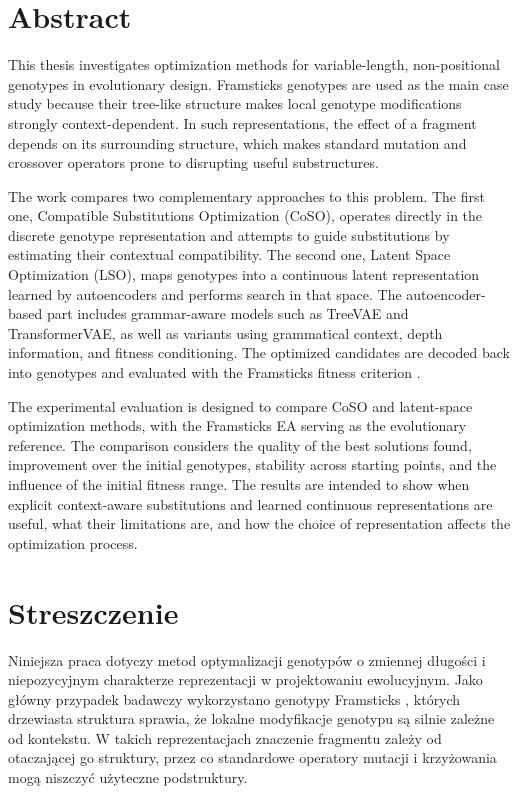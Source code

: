 \chapter*{Abstract}

This thesis investigates optimization methods for variable-length, non-positional genotypes in evolutionary design. Framsticks \fone{} genotypes are used as the main case study because their tree-like structure makes local genotype modifications strongly context-dependent. In such representations, the effect of a fragment depends on its surrounding structure, which makes standard mutation and crossover operators prone to disrupting useful substructures.

The work compares two complementary approaches to this problem. The first one, Compatible Substitutions Optimization (CoSO), operates directly in the discrete genotype representation and attempts to guide substitutions by estimating their contextual compatibility. The second one, Latent Space Optimization (LSO), maps genotypes into a continuous latent representation learned by autoencoders and performs search in that space. The autoencoder-based part includes grammar-aware models such as TreeVAE and TransformerVAE, as well as variants using grammatical context, depth information, and fitness conditioning. The optimized candidates are decoded back into \fone{} genotypes and evaluated with the Framsticks fitness criterion \vertpos{}.

The experimental evaluation is designed to compare CoSO and latent-space optimization methods, with the Framsticks EA serving as the evolutionary reference. The comparison considers the quality of the best solutions found, improvement over the initial genotypes, stability across starting points, and the influence of the initial fitness range. The results are intended to show when explicit context-aware substitutions and learned continuous representations are useful, what their limitations are, and how the choice of representation affects the optimization process.

\cleardoublepage

\chapter*{Streszczenie}

Niniejsza praca dotyczy metod optymalizacji genotypów o zmiennej długości i niepozycyjnym charakterze reprezentacji w projektowaniu ewolucyjnym. Jako główny przypadek badawczy wykorzystano genotypy Framsticks \fone{}, których drzewiasta struktura sprawia, że lokalne modyfikacje genotypu są silnie zależne od kontekstu. W takich reprezentacjach znaczenie fragmentu zależy od otaczającej go struktury, przez co standardowe operatory mutacji i krzyżowania mogą niszczyć użyteczne podstruktury.

